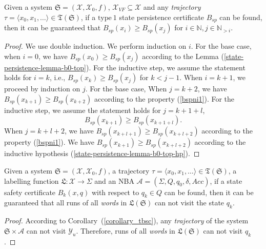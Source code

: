 \documentclass[acmlarge]{acmart}
\begin{document}
\begin{lemma}
  \label{state-peristence-lemma-non-increase}
  Given a system $\mathfrak{S}=(\mathcal{X}, \mathcal{X}_0, f)$, $\mathcal{X}_{VF} \subseteq \mathcal{X}$ and any \emph{trajectory} $\tau  = \langle x_0, x_1, \dots \rangle \in \mathfrak{T}(\mathfrak{S})$, 
  if a $\mathrm{type~1}$ state persistence certificate $B_{sp}$ can be found, 
  then it can be guaranteed that $B_{sp}(x_i) \geq B_{sp}(x_j)$ for $i \in \mathbb{N}, j \in \mathbb{N}_{>i}$.
\end{lemma}
\begin{proof}
  We use double induction. 
  We perform induction on $i$. 
  For the base case, when $i = 0$, we have $B_{sp}(x_0) \geq B_{sp}(x_j)$ according to the Lemma (\ref{state-persistence-lemma-b0-top}).
  For the inductive step, we assume the statement holds for $i = k$, i.e., $B_{sp}(x_k) \geq B_{sp}(x_j)$ for $k < j-1$. 
  When $i = k+1$,  we proceed by induction on $j$.
  For the base case, When $j = k + 2$, we have $B_{sp}(x_{k+1}) \geq B_{sp}(x_{k+2})$ according to the property (\ref{bspni1}).
  For the inductive step, we assume the statement holds for $j=k+1+l$,
  \begin{equation}
  B_{sp}(x_{k+1}) \geq B_{sp}(x_{k+1+l}).
  \label{state-persistence-lemma-b0-top-hp}
  \end{equation} 
  When $j = k + l + 2$, we have $B_{sp}(x_{k+l+1}) \geq B_{sp}(x_{k+l+2})$ according to the property (\ref{bspni1}). 
  We have $B_{sp}(x_{k+1}) \geq B_{sp}(x_{k+l+2})$ according to the inductive hypothesis (\ref{state-persistence-lemma-b0-top-hp}). 
\end{proof}

\begin{theorem}
  \label{state-safety-lemma}
  Given a system $\mathfrak{S} = (\mathcal{X}, \mathcal{X}_0, f)$, a trajectory $\tau=\langle x_0, x_1, \dots \rangle \in \mathfrak{T}(\mathfrak{S})$, a labelling function $\mathfrak{L}:\mathcal{X} \rightarrow \Sigma$ and an NBA $\mathcal{A}=(\Sigma, Q, q_0, \delta, Acc)$, if a state safety certificate \(B_{k}(x, q)\) with respect to $q_k \in Q$ can be found, then it can be guaranteed that all runs of all \emph{words} in $\mathfrak{L}(\mathfrak{S})$ can not visit the state $q_k$.
\end{theorem}

\begin{proof}
  According to Corollary~(\ref{corollary_tbsc}), any \emph{trajectory} of the system $\mathfrak{S} \times \mathcal{A}$ can not visit $\mathcal{Y}_u$. Therefore, runs of all \emph{words} in $\mathfrak{L}(\mathfrak{S})$ can not visit $q_k$.
\end{proof}
\end{document}
